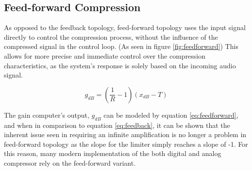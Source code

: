 \documentclass[10pt]{article}
\begin{document}
\begin{multicols*}{2}
                \vspace{2ex}

            \subsection{Feed-forward Compression} \label{sect:feed-forward-comp}
                As opposed to the feedback topology, feed-forward topology uses the input signal directly to control the compression process, without the influence of the compressed signal in the control loop. (As seen in figure \ref{fig:feedforward}) This allows for more precise and immediate control over the compression characteristics, as the system's response is solely based on the incoming audio signal.\par

                    \begin{equation}\label{eq:feedforward}
                        g_{dB}=(\frac{1}{R}-1)(x_{dB}-T)
                    \end{equation}
                    
                \noindent The gain computer's output, $g_{dB}$ can be modeled by equation \ref{eq:feedforward}, and when in comparison to equation \ref{eq:feedback}, it can be shown that the inherent issue seen in requiring an infinite amplification is no longer a problem in feed-forward topology as the slope for the limiter simply reaches a slope of -1. For this reason, many modern implementation of the both digital and analog compressor rely on the feed-forward variant.

                \vspace{2ex}

                    \noindent
                    \begin{minipage}{\linewidth}

                        \centering

\end{minipage}
\end{multicols*}
\end{document}
